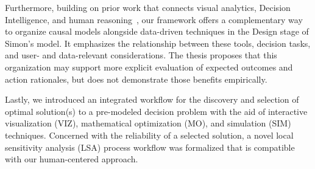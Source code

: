 \documentclass{sfuthesis}
\begin{document}
Furthermore, building on prior work that connects visual analytics, Decision Intelligence, and human reasoning~\cite{zaimoglu2023epistemological,pratt_bringing_2023}, our framework offers a complementary way to organize causal models alongside data-driven techniques in the Design stage of Simon’s model. It emphasizes the relationship between these tools, decision tasks, and user- and data-relevant considerations. The thesis proposes that this organization may support more explicit evaluation of expected outcomes and action rationales, but does not demonstrate those benefits empirically.\par
Lastly, we introduced an integrated workflow for the discovery and selection of optimal solution(s) to a pre-modeled decision problem with the aid of interactive visualization (VIZ), mathematical optimization (MO), and simulation (SIM) techniques. Concerned with the reliability of a selected solution, a novel local sensitivity analysis (LSA) process workflow was formalized that is compatible with our human-centered approach. 
\end{document}
